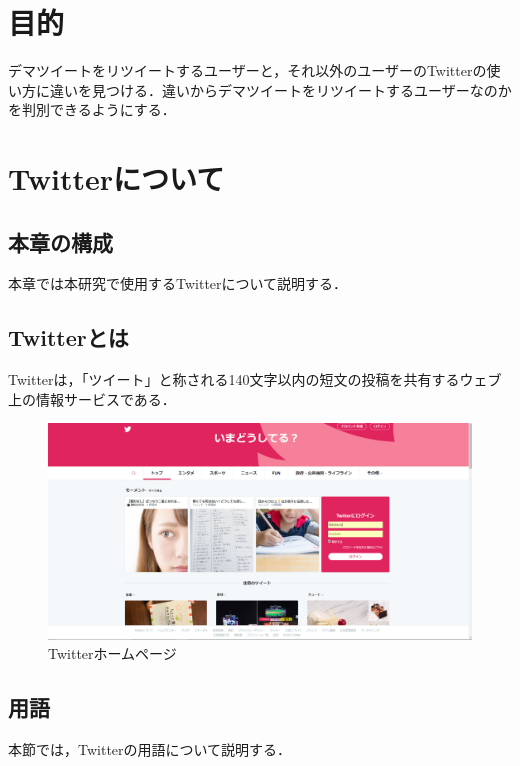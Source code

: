 \chapter{目的}
デマツイートをリツイートするユーザーと，それ以外のユーザーのTwitterの使い方に違いを見つける．違いからデマツイートをリツイートするユーザーなのかを判別できるようにする．

\chapter{Twitterについて}

\section{本章の構成}
本章では本研究で使用するTwitterについて説明する．

\section{Twitterとは}
Twitterは，「ツイート」と称される140文字以内の短文の投稿を共有するウェブ上の情報サービスである．
\begin{figure}[h]
\centering
\includegraphics[width=13cm]{01.png}
\caption{Twitterホームページ}\label{1}
\end{figure}
\clearpage

\section{用語}
本節では，Twitterの用語について説明する．

